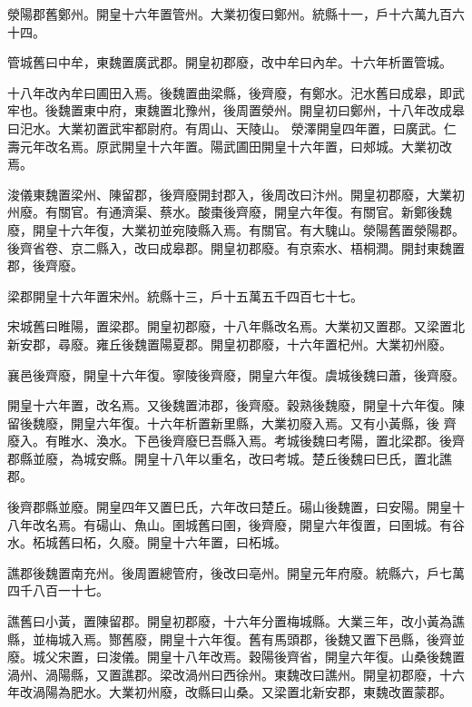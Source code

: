 \begin{pinyinscope}
 滎陽郡舊鄭州。開皇十六年置管州。大業初復曰鄭州。統縣十一，戶十六萬九百六十四。



 管城舊曰中牟，東魏置廣武郡。開皇初郡廢，改中牟曰內牟。十六年析置管城。



 十八年改內牟曰圃田入焉。後魏置曲梁縣，後齊廢，有鄭水。汜水舊曰成皋，即武牢也。後魏置東中府，東魏置北豫州，後周置滎州。開皇初曰鄭州，十八年改成皋曰汜水。大業初置武牢都尉府。有周山、天陵山。
 滎澤開皇四年置，曰廣武。仁壽元年改名焉。原武開皇十六年置。陽武圃田開皇十六年置，曰郟城。大業初改焉。



 浚儀東魏置梁州、陳留郡，後齊廢開封郡入，後周改曰汴州。開皇初郡廢，大業初州廢。有關官。有通濟渠、蔡水。酸棗後齊廢，開皇六年復。有關官。新鄭後魏廢，開皇十六年復，大業初並宛陵縣入焉。有關官。有大騩山。滎陽舊置滎陽郡。後齊省卷、京二縣入，改曰成皋郡。開皇初郡廢。有京索水、梧桐澗。開封東魏置郡，後齊廢。



 梁郡開皇十六年置宋州。統縣十三，戶十五萬五千四百七十七。



 宋城舊曰睢陽，置梁郡。開皇初郡廢，十八年縣改名焉。大業初又置郡。又梁置北新安郡，尋廢。雍丘後魏置陽夏郡。開皇初郡廢，十六年置杞州。大業初州廢。



 襄邑後齊廢，開皇十六年復。寧陵後齊廢，開皇六年復。虞城後魏曰蕭，後齊廢。



 開皇十六年置，改名焉。又後魏置沛郡，後齊廢。穀熟後魏廢，開皇十六年復。陳留後魏廢，開皇六年復。十六年析置新里縣，大業初廢入焉。又有小黃縣，後
 齊廢入。有睢水、渙水。下邑後齊廢巳吾縣入焉。考城後魏曰考陽，置北梁郡。後齊郡縣並廢，為城安縣。開皇十八年以重名，改曰考城。楚丘後魏曰巳氏，置北譙郡。



 後齊郡縣並廢。開皇四年又置巳氏，六年改曰楚丘。碭山後魏置，曰安陽。開皇十八年改名焉。有碭山、魚山。圉城舊曰圉，後齊廢，開皇六年復置，曰圉城。有谷水。柘城舊曰柘，久廢。開皇十六年置，曰柘城。



 譙郡後魏置南充州。後周置總管府，後改曰亳州。開皇元年府廢。統縣六，戶七萬四千八百一十七。



 譙舊曰小黃，置陳留郡。開皇初郡廢，十六年分置梅城縣。大業三年，改小黃為譙縣，並梅城入焉。酂舊廢，開皇十六年復。舊有馬頭郡，後魏又置下邑縣，後齊並廢。城父宋置，曰浚儀。開皇十八年改焉。穀陽後齊省，開皇六年復。山桑後魏置渦州、渦陽縣，又置譙郡。梁改渦州曰西徐州。東魏改曰譙州。開皇初郡廢，十六年改渦陽為肥水。大業初州廢，改縣曰山桑。又梁置北新安郡，東魏改置蒙郡。




\end{pinyinscope}
